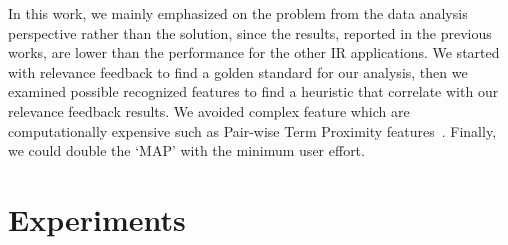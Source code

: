 \documentclass{sig-alternate}
\begin{document}
In this work, we mainly emphasized on the problem from the data analysis perspective rather than the solution, since the results, reported in the previous works, are lower than the performance for the other IR applications. We started with relevance feedback to find a golden standard for our analysis, then we examined possible recognized features to find a heuristic that correlate with our relevance feedback results. We avoided complex feature which are computationally expensive such as Pair-wise Term Proximity features~\cite{bashir2010improving}. Finally, we could double the `MAP' with the minimum user effort. 
\section{Experiments}
\end{document}
